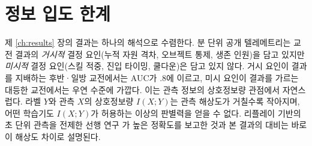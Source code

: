 
\section{정보 입도 한계}
\label{sec:disc-granularity}

제 \ref{ch:results} 장의 결과는 하나의 해석으로 수렴한다. 분 단위 공개 텔레메트리는 교전 결과의 \emph{거시적} 결정 요인(누적 자원 격차, 오브젝트 통제, 생존 인원)을 담고 있지만 \emph{미시적} 결정 요인(스킬 적중, 진입 타이밍, 쿨다운)은 담고 있지 않다. 거시 요인이 결과를 지배하는 후반·일방 교전에서는 AUC가 $.8$에 이르고, 미시 요인이 결과를 가르는 대등한 교전에서는 우연 수준에 가깝다. 이는 관측 정보의 상호정보량 관점에서 자연스럽다. 라벨 $Y$와 관측 $X$의 상호정보량 $I(X;Y)$는 관측 해상도가 거칠수록 작아지며, 어떤 학습기도 $I(X;Y)$가 허용하는 이상의 판별력을 얻을 수 없다. 리플레이 기반의 초 단위 관측을 전제한 선행 연구 \cite{katona2019time}가 높은 정확도를 보고한 것과 본 결과의 대비는 바로 이 해상도 차이로 설명된다.
